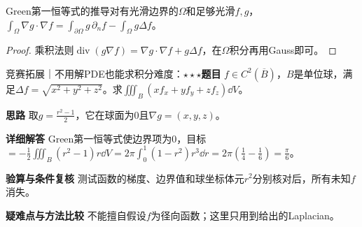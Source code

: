 \begin{theorem}{Green第一恒等式的推导}对有光滑边界的$\Omega$和足够光滑$f,g$，$\int_\Omega\nabla g\cdot\nabla f=\int_{\partial\Omega}g\,\partial_nf-\int_\Omega g\Delta f$。\end{theorem}\begin{proof}乘积法则$\operatorname{div}(g\nabla f)=\nabla g\cdot\nabla f+g\Delta f$，在$\Omega$积分再用Gauss即可。\end{proof}

\begin{example}{竞赛拓展｜不用解PDE也能求积分}{难度：$\star\star\star$}\label{ic:ex:delta_fields:laplacianmoment}\textbf{题目} $f\in C^2(\overline B)$，$B$是单位球，满足$\Delta f=\sqrt{x^2+y^2+z^2}$。求$\iiint_B(xf_x+yf_y+zf_z)\dd V$。\par \textbf{思路} 取$g=\frac{r^2-1}{2}$，它在球面为0且$\nabla g=(x,y,z)$。\par \textbf{详细解答} Green第一恒等式使边界项为0，目标$=-\frac12\iiint_B(r^2-1)r\dd V=2\pi\int_0^1(1-r^2)r^3\dd r=2\pi(\frac{1}{4}-\frac{1}{6})=\frac{\pi}{6}$。\par \textbf{验算与条件复核} 测试函数的梯度、边界值和球坐标体元$r^2$分别核对后，所有未知$f$消失。\par \textbf{疑难点与方法比较} 不能擅自假设$f$为径向函数；这里只用到给出的Laplacian。\end{example}
